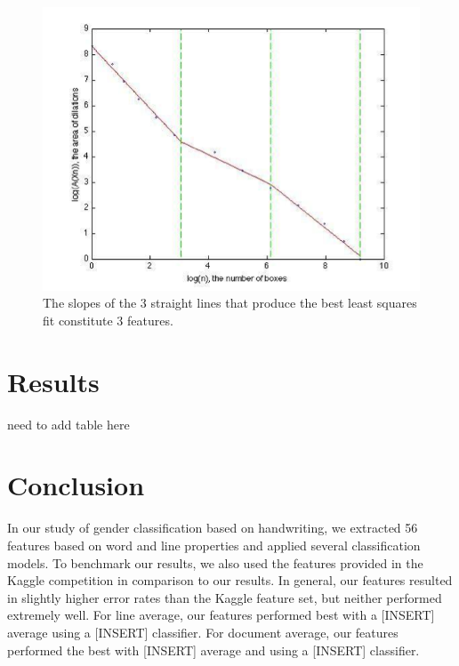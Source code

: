 \documentclass[paper=a4, fontsize=11pt]{scrartcl} %
\numberwithin{equation}{section} %
\numberwithin{figure}{section} %
\numberwithin{table}{section} %
\begin{document}
\begin{figure}
  \includegraphics{fractaldimension.png}
  \caption{The slopes of the 3 straight lines that produce the best
    least squares fit constitute 3 features.}
  \label{fig:fractaldimension}

\end{figure}

\section{Results}
need to add table here
\label{sec:results}
\section{Conclusion}
In our study of gender classification based on handwriting, we
extracted 56 features based on word and line properties and applied
several classification models. To benchmark our results, we also used
the features provided in the Kaggle competition in comparison to our
results. In general, our features resulted in slightly higher error
rates than the Kaggle feature set, but neither performed extremely
well. For line average, our features performed best with a [INSERT]
average using a [INSERT] classifier. For document average, our
features performed the best with [INSERT] average and using a [INSERT]
classifier.
\end{document}
